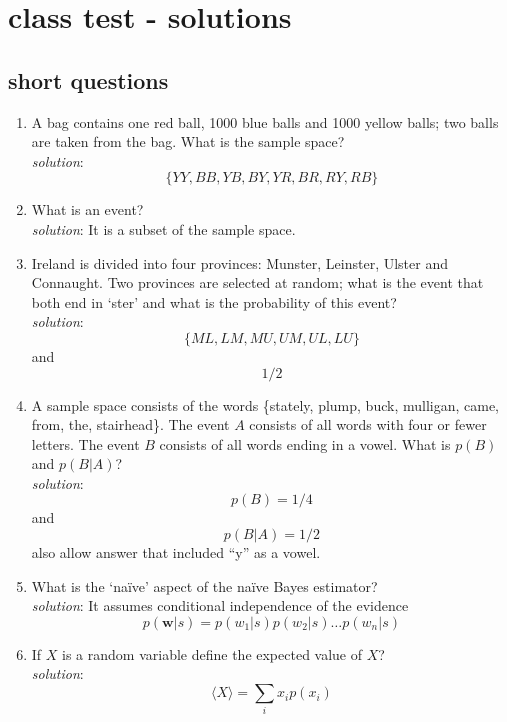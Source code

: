 \documentclass[11pt,a4paper]{scrartcl}
\begin{document}
\section*{class test - solutions}

\subsection*{short questions}



\begin{enumerate} 

\item A bag contains one red ball, 1000 blue balls and 1000 yellow balls; two balls are taken from the bag. What is the sample space?
\\ \textsl{solution}: 
$$
\{YY,BB,YB,BY,YR,BR,RY,RB\}
$$

\item What is an event?
\\ \textsl{solution}: 
It is a subset of the sample space.

\item Ireland is divided into four provinces: Munster, Leinster, Ulster and Connaught. Two provinces are selected at random; what is the event that both end in \lq{}ster\rq{} and what is the probability of this event?
\\ \textsl{solution}: 
  $$\{ML,LM,MU,UM,UL,LU\} $$
  and
  $$1/2$$ 

\item A sample space consists of the words \{stately, plump, buck, mulligan, came, from, the, stairhead\}. The event $A$ consists of all words with four or fewer letters. The event $B$ consists of all words ending in a vowel. What is $p(B)$ and $p(B|A)$?
\\ \textsl{solution}: 
$$p(B)=1/4$$ 
and
$$p(B|A)=1/2$$
also allow answer that included ``y'' as a vowel.

\item What is the \lq{}na\"{i}ve\rq{} aspect of the na\"{i}ve Bayes estimator?
\\ \textsl{solution}: 
It assumes conditional independence of the evidence $$p(\textbf{w}|s)=p(w_1|s)p(w_2|s)\ldots p(w_n|s)$$

\item If $X$ is a random variable define the expected value of $X$?
\\ \textsl{solution}: 
$$\langle X\rangle =\sum_i x_i p(x_i)$$


\end{enumerate}
\end{document}
